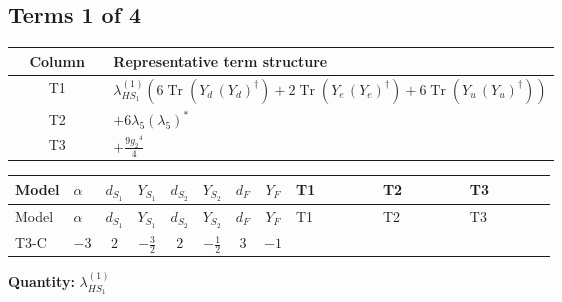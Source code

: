 \documentclass[8pt]{article}
\begin{document}
\begin{landscape}
\subsection*{Terms 1 of 4}
\begin{center}
\begin{tabular}{@{}c >{\raggedright\arraybackslash}p{0.82\linewidth}@{}}
\toprule
Column & Representative term structure \\
\midrule
T1 & \(\displaystyle {\lambda_{HS_1}^{(1)}} (6 \operatorname{Tr}\!\left({Y_d}\,\left({Y_d}\right)^{\dagger}\right)+2 \operatorname{Tr}\!\left({Y_e}\,\left({Y_e}\right)^{\dagger}\right)+6 \operatorname{Tr}\!\left({Y_u}\,\left({Y_u}\right)^{\dagger}\right))\) \\
\midrule
T2 & \(\displaystyle +6 {\lambda_5} \left({\lambda_5}\right)^{*}\) \\
\midrule
T3 & \(\displaystyle +\frac{9 {g_2}^4}{4}\) \\
\midrule
\bottomrule
\end{tabular}
\end{center}
\smallskip
\tiny
\begin{longtable}{@{}llcccccc >{\raggedright\arraybackslash}p{0.21\linewidth} >{\raggedright\arraybackslash}p{0.21\linewidth} >{\raggedright\arraybackslash}p{0.21\linewidth}@{}}
\toprule
Model & $\alpha$ & $d_{S_1}$ & $Y_{S_1}$ & $d_{S_2}$ & $Y_{S_2}$ & $d_F$ & $Y_F$ & T1 & T2 & T3 \\
\midrule
\endfirsthead
\toprule
Model & $\alpha$ & $d_{S_1}$ & $Y_{S_1}$ & $d_{S_2}$ & $Y_{S_2}$ & $d_F$ & $Y_F$ & T1 & T2 & T3 \\
\midrule
\endhead
T3-C & $-3$ & $2$ & $-\frac{3}{2}$ & $2$ & $-\frac{1}{2}$ & $3$ & $-1$ & \scriptsize\adjustbox{max width=\linewidth}{$\begin{gathered} {\lambda_{HS_1}^{(1)}} (6 \operatorname{Tr}\!\left({Y_d}\,\left({Y_d}\right)^{\dagger}\right)+2 \operatorname{Tr}\!\left({Y_e}\,\left({Y_e}\right)^{\dagger}\right)+6 \operatorname{Tr}\!\left({Y_u}\,\left({Y_u}\right)^{\dagger}\right))\end{gathered}$} & \scriptsize\adjustbox{max width=\linewidth}{$\begin{gathered} +6 {\lambda_5} \left({\lambda_5}\right)^{*}\end{gathered}$} & \scriptsize\adjustbox{max width=\linewidth}{$\begin{gathered} +\frac{9 {g_2}^4}{4}\end{gathered}$} \\
\midrule
\bottomrule
\end{longtable}
\clearpage
\noindent\textbf{Quantity: }$\lambda_{HS_1}^{(1)}$\par\smallskip

\end{landscape}
\end{document}
